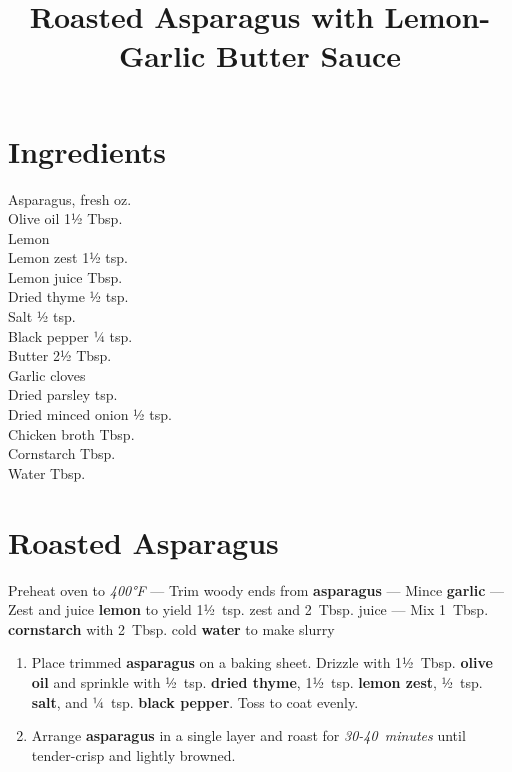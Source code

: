 \documentclass[11pt,letterpaper]{article}
\title{Roasted Asparagus with Lemon-Garlic Butter Sauce}
\author{}
\date{}
\begin{document}
\maketitle
\thispagestyle{empty}

\section*{Ingredients}
\setlength{\columnsep}{20pt}
\begin{multicols}{2}
\noindent
    Asparagus, fresh  oz. \\
    Olive oil \dotfill 1½ Tbsp. \\
    Lemon  \\
    Lemon zest \dotfill 1½ tsp. \\
    Lemon juice  Tbsp. \\
    Dried thyme \dotfill ½ tsp. \\
    Salt \dotfill ½ tsp. \\
    Black pepper \dotfill ¼ tsp. \\
	\columnbreak
    Butter \dotfill 2½ Tbsp. \\
    Garlic cloves  \\
    Dried parsley  tsp. \\
    Dried minced onion \dotfill ½ tsp. \\
    Chicken broth  Tbsp. \\
    Cornstarch  Tbsp. \\
    Water  Tbsp. \\
\end{multicols}

\section*{Roasted Asparagus}

\noindent
Preheat oven to \textit{400°F} ---
Trim woody ends from \textbf{asparagus} ---
Mince \textbf{garlic} ---
Zest and juice \textbf{lemon} to yield 1½~tsp. zest and 2~Tbsp. juice ---
Mix 1~Tbsp. \textbf{cornstarch} with 2~Tbsp. cold \textbf{water} to make slurry

\begin{enumerate}
    \item Place trimmed \textbf{asparagus} on a baking sheet. Drizzle with 1½~Tbsp. \textbf{olive oil} and sprinkle with ½~tsp. \textbf{dried thyme}, 1½~tsp. \textbf{lemon zest}, ½~tsp. \textbf{salt}, and ¼~tsp. \textbf{black pepper}. Toss to coat evenly.
    
    \item Arrange \textbf{asparagus} in a single layer and roast for \textit{30-40~minutes} until tender-crisp and lightly browned.
\end{enumerate}
\end{document}
